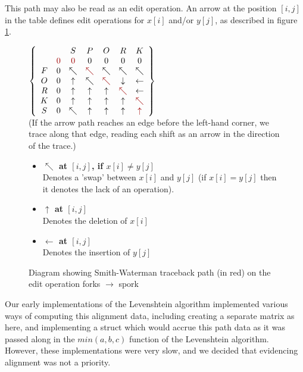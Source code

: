 This path may also be read as an edit operation. An arrow at the
position $[i,j]$ in the table defines edit operations for $x[i]$
and/or $y[j]$, as described in figure
\ref{fig:smith-waterman-traceback}.

\begin{figure}[h]
  \centering 
  $\left\{
  \begin{array}{ccccccc}
    & & S & P & O & R & K \\ & \color{red}{0} & \color{red}{0} & 0 & 0
    & 0 & 0 \\ F & 0 & \nwarrow & \color{red}{\nwarrow} & \nwarrow &
    \nwarrow & \nwarrow \\ O & 0 & \uparrow & \nwarrow &
    \color{red}{\nwarrow} & \downarrow & \leftarrow \\ R & 0 &
    \uparrow & \uparrow & \uparrow & \color{red}{\nwarrow} &
    \leftarrow \\ K & 0 & \uparrow & \uparrow & \uparrow & \uparrow &
    \color{red}{\nwarrow} \\ S & 0 & \nwarrow & \uparrow & \uparrow &
    \uparrow & \color{red}{\uparrow} \\
  \end{array}\right\} $\\
  \vspace{2mm}
  (If the arrow path reaches an edge before the left-hand corner, we trace
  along that edge, reading each shift as an arrow in the direction of
  the trace.)
  \vspace{5mm}
  \begin{itemize}
  \item \textbf{$\nwarrow$ at $[i,j]$, if $x[i] \neq y[j]$} \\ Denotes a
    'swap' between $x[i]$ and $y[j]$ (if $x[i] = y[j]$ then it denotes
    the lack of an operation).
  \item \textbf{$\uparrow$ at $[i,j]$}\\Denotes the deletion of $x[i]$
  \item \textbf{$\leftarrow$ at $[i,j]$}\\Denotes the insertion of
    $y[j]$
  \end{itemize}
  \vspace{5mm}
  \caption{Diagram showing Smith-Waterman traceback path (in red) on
    the edit operation forks $\rightarrow$ spork}
  \label{fig:smith-waterman-traceback}
\end{figure}

Our early implementations of the Levenshtein algorithm implemented
various ways of computing this alignment data, including creating a
separate matrix as here, and implementing a struct which would accrue
this path data as it was passed along in the $min(a,b,c)$ function of
the Levenshtein algorithm. However, these implementations were very
slow, and we decided that evidencing alignment was not a priority. 

